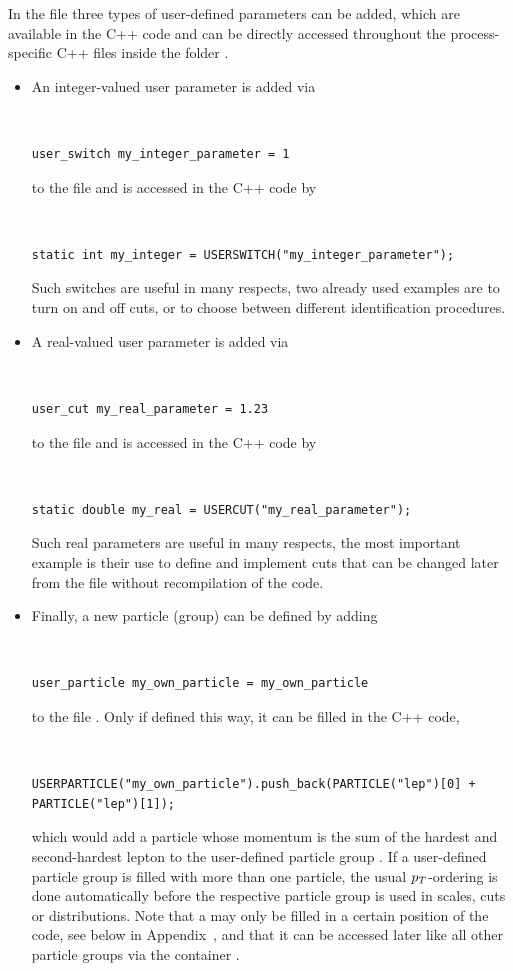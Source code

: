 \documentclass[english,11pt]{article}
\begin{document}
In the file  three types of user-defined parameters can be added, which are available in the C++ code and can be directly accessed throughout 
the process-specific C++ files inside the folder \Matrixversion{}.
\begin{itemize}
\item An integer-valued user parameter is added via
{\tt
\begin{lstlisting}[style=InputStyle]
user_switch my_integer_parameter = 1
\end{lstlisting}
}
to the file  and is accessed in the C++ code by
{\tt
\begin{lstlisting}                 
static int my_integer = USERSWITCH("my_integer_parameter");
\end{lstlisting}
}
Such switches are useful in many respects, two already used examples are to turn on and off cuts, or to choose between different identification procedures.

\item A real-valued user parameter is added via
{\tt
\begin{lstlisting}[style=InputStyle]
user_cut my_real_parameter = 1.23
\end{lstlisting}
}
to the file  and is accessed in the C++ code by
{\tt
\begin{lstlisting}                 
static double my_real = USERCUT("my_real_parameter");
\end{lstlisting}
}
Such real parameters are useful in many respects, the most important example is their use to define and implement cuts that can be changed later from the 
file  without recompilation of the code.

\item Finally, a new particle (group) can be defined by adding
{\tt
\begin{lstlisting}[style=InputStyle]
user_particle my_own_particle = my_own_particle
\end{lstlisting}
}
to the file . Only if defined this way, it can be 
filled in the C++ code,
{\tt
\begin{lstlisting}
USERPARTICLE("my_own_particle").push_back(PARTICLE("lep")[0] + PARTICLE("lep")[1]);
\end{lstlisting}
}
which would add a particle whose momentum is the sum of the hardest and second-hardest lepton 
to the user-defined particle group . If a user-defined particle group is filled with more than one particle, 
the usual $p_T$-ordering is done automatically before the respective particle group is used in scales, cuts or distributions. 
Note that a  may only be filled in a certain position of the code,
see below in Appendix~, and that it can be accessed later 
like all other particle groups via the container .



\end{itemize}
\end{document}
